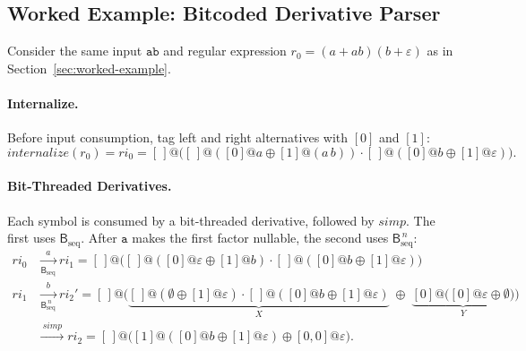 %
%
%

\subsection{Worked Example: Bitcoded Derivative Parser}
\label{sec:deriv-bc-worked}

Consider the same input $\texttt{ab}$ and regular expression
$r_0=(a+ab)(b+\varepsilon)$ as in Section~\ref{sec:worked-example}.

%

\paragraph{Internalize.}
Before input consumption, 
tag left and right alternatives with $[0]$ and $[1]$:
\begin{equation}\label{eq:dpbc-internalize}
\mathit{internalize}(r_0) = \mathit{ri}_0 =
[\,]@\big(
  [\,]@([0]@a \oplus [1]@(a\,b))
  \cdot
  [\,]@([0]@b \oplus [1]@\varepsilon)
\big).
\end{equation}

%

\paragraph{Bit-Threaded Derivatives.}
Each symbol is consumed by a bit-threaded derivative, 
followed by $\mathit{simp}$. 
The first uses $\mathsf{B}_{\mathrm{seq}}$. 
After $\mathtt{a}$ makes the first factor nullable, 
the second uses $\mathsf{B}_{\mathrm{seq}}^{\,n}$:
{\small
\begin{equation}\label{eq:dpbc-forward}
\begin{aligned}
\mathit{ri}_0
  &\xrightarrow[\mathsf{B}_{\mathrm{seq}}]{\ a\ }
  \mathit{ri}_1 =
  [\,]@\big(
    [\,]@([0]@\varepsilon \oplus [1]@b)
    \cdot
    [\,]@([0]@b \oplus [1]@\varepsilon)
  \big) \\
\mathit{ri}_1
  &\xrightarrow[\mathsf{B}_{\mathrm{seq}}^{\,n}]{\ b\ }
  \mathit{ri}_2' =
  [\,]@\Big(
    \underbrace{[\,]@(\emptyset \oplus [1]@\varepsilon)
      \cdot [\,]@([0]@b \oplus [1]@\varepsilon)}_{X}
    \;\oplus\;
    \underbrace{[0]@\big([0]@\varepsilon \oplus \emptyset\big)}_{Y}
  \Big) \\
  &\xrightarrow{\ \mathit{simp}\ }
  \mathit{ri}_2 =
  [\,]@\big(
    [1]@([0]@b \oplus [1]@\varepsilon)
    \oplus
    [0,0]@\varepsilon
  \big).
\end{aligned}
\end{equation}
}

